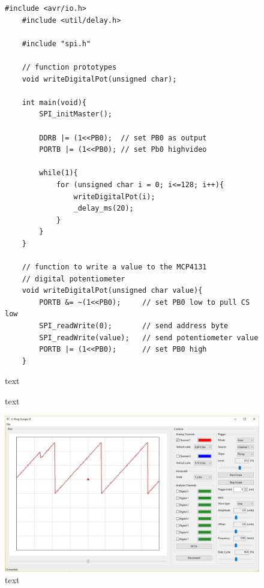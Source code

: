 \documentclass[a4paper]{article}
\begin{document}
\begin{figure}[h]
	\begin{lstlisting}[style=CStyle]
	#include <avr/io.h>
	#include <util/delay.h>
	
	#include "spi.h"
	
	// function prototypes
	void writeDigitalPot(unsigned char);
	
	int main(void){
		SPI_initMaster();
	
		DDRB |= (1<<PB0);  // set PB0 as output
		PORTB |= (1<<PB0); // set Pb0 highvideo
	
		while(1){
			for (unsigned char i = 0; i<=128; i++){
				writeDigitalPot(i);
				_delay_ms(20);
			}
		}
	}
	
	// function to write a value to the MCP4131
	// digital potentiometer
	void writeDigitalPot(unsigned char value){
		PORTB &= ~(1<<PB0);		// set PB0 low to pull CS low
		SPI_readWrite(0);		// send address byte
		SPI_readWrite(value);	// send potentiometer value
		PORTB |= (1<<PB0);		// set PB0 high
	}
	\end{lstlisting}
	\caption{text}
\end{figure}

\begin{figure}[h]
	\centering
	\caption{text}
\end{figure}

\begin{figure}
	\centering
	\includegraphics[scale=0.5]{fig8}
	\caption{text}
\end{figure}
\end{document}
